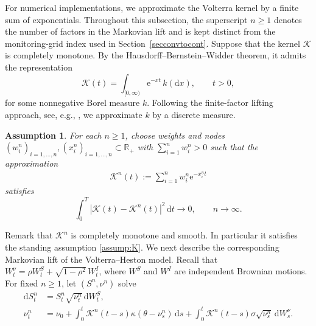 \documentclass[10pt,a4paper,reqno]{amsart}
\theoremstyle{plain}
\newtheorem{assumption}[theorem]{Assumption}
\theoremstyle{definition}
\theoremstyle{remark}
\theoremstyle{example}
\begin{document}
For numerical implementations, we approximate the Volterra kernel by a finite sum of exponentials. Throughout this subsection, the superscript $n\geq1$ denotes the number of factors in the Markovian lift and is kept distinct from the monitoring-grid index used in Section~\ref{secconvtocont}. Suppose that the kernel $\mathcal K$ is completely monotone. By the Hausdorff--Bernstein--Widder  theorem, it admits the representation
\[
    \mathcal K(t) = \int_{[0,\infty)} \mathrm e^{-xt}\, k(\mathrm dx), \qquad t>0,
\]
for some nonnegative Borel measure $k$. Following the finite-factor lifting approach, see, e.g., \cite{abi2019lifting,AK21, Bayer2023}, we approximate $k$ by a discrete measure. 

\begin{assumption}\label{assumption:nodes-and-weights}
For each $n\geq1$, choose weights and nodes $(w_i^n)_{i=1,\dots, n}, (x_i^n)_{i=1,\dots, n} \subset \mathbb{R}_+$ with $\sum_{i=1}^n w_i^n > 0$ such that the approximation 
\begin{align}\label{eq:finite-factor-kernel}
    \mathcal K^n(t) := \sum_{i=1}^n w_i^n\mathrm e^{-x_i^n t}
\end{align}
satisfies 
\[
    \int_0^T |\mathcal{K}(t) - \mathcal{K}^n(t)|^2\, \mathrm{d}t \longrightarrow 0, \qquad n \to \infty.
\]
\end{assumption}

Remark that $\mathcal{K}^n$ is completely monotone and smooth. In particular it satisfies the standing assumption \ref{assump:K}. We next describe the corresponding Markovian lift of the Volterra--Heston model. Recall that $W_t^\nu = \rho W_t^S + \sqrt{1-\rho^2}\,W_t^I$, where $W^S$ and $W^I$ are independent Brownian motions. For fixed $n\geq1$, let $(S^n,\nu^n)$ solve
\begin{align}
    \mathrm dS_t^n &= S_t^n\sqrt{\nu_t^n}\, \mathrm dW_t^S, \label{eq:lifted-S}
    \\ \nu_t^n &= \nu_0 + \int_0^t \mathcal K^n(t-s) \kappa(\theta-\nu_s^n)\, \mathrm ds + \int_0^t \mathcal K^n(t-s) \sigma\sqrt{\nu_s^n}\, \mathrm dW_s^\nu. \label{eq:lifted-volterra-variance}
\end{align}
\end{document}
